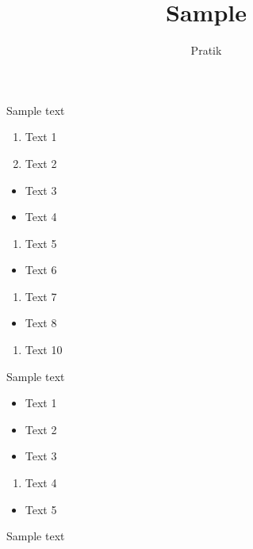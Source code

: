 \documentclass[12pt]{article}
\begin{document}
\title{Sample}
\author{Pratik}\maketitle

Sample text

\begin{enumerate}
\item Text 1
\item Text 2
\end{enumerate}
\begin{itemize}
\item Text 3
\item Text 4
\end{itemize}
\begin{enumerate}
\item Text 5
\end{enumerate}
\begin{itemize}
\item Text 6
\end{itemize}
\begin{enumerate}
\item Text 7
\end{enumerate}
\begin{itemize}
\item Text 8
\end{itemize}
\begin{enumerate}
\item Text 10
\end{enumerate}

Sample text

\begin{itemize}
\item Text 1
\item Text 2
\item Text 3
\end{itemize}
\begin{enumerate}
\item Text 4
\end{enumerate}
\begin{itemize}
\item Text 5
\end{itemize}

Sample text
\end{document}
